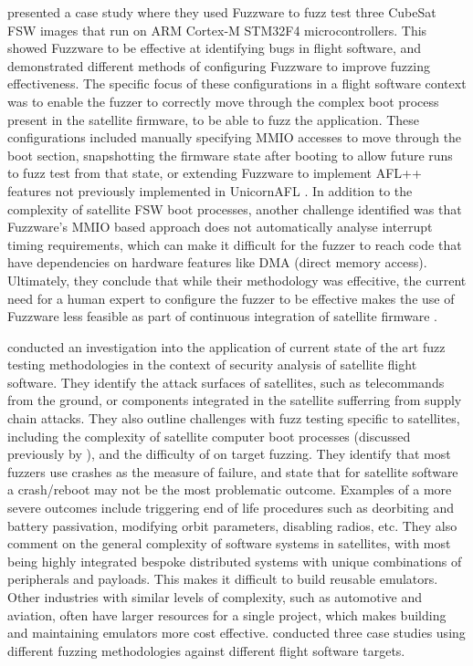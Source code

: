\documentclass[../report.tex]{subfiles}
\begin{document}
\citet{Scharnowski_2023} presented a case study where they used Fuzzware
\citep{Fuzzware_2022} to fuzz test three CubeSat FSW images that run on ARM
Cortex-M STM32F4 microcontrollers. This showed Fuzzware to be effective at
identifying bugs in flight software, and demonstrated different methods of
configuring Fuzzware to improve fuzzing effectiveness. The specific focus of
these configurations in a flight software context was to enable the fuzzer to
correctly move through the complex boot process present in the satellite
firmware, to be able to fuzz the application. These configurations included
manually specifying MMIO accesses to move through the boot section,
snapshotting the firmware state after booting to allow future runs to fuzz test
from that state, or extending Fuzzware to implement AFL++ features not
previously implemented in UnicornAFL \citep{Scharnowski_2023}. In addition to
the complexity of satellite FSW boot processes, another challenge identified
was that Fuzzware's MMIO based approach does not automatically analyse
interrupt timing requirements, which can make it difficult for the fuzzer to
reach code that have dependencies on hardware features like DMA (direct memory
access). Ultimately, they conclude that while their methodology was effecitive,
the current need for a human expert to configure the fuzzer to be effective
makes the use of Fuzzware less feasible as part of continuous integration of
satellite firmware \citep{Scharnowski_2023}.

\citet{Willbold_2024} conducted an investigation into the application of
current state of the art fuzz testing methodologies in the context of security
analysis of satellite flight software. They identify the attack surfaces of
satellites, such as telecommands from the ground, or components integrated in
the satellite sufferring from supply chain attacks. They also outline
challenges with fuzz testing specific to satellites, including the complexity
of satellite computer boot processes (discussed previously by
\citet{Scharnowski_2023}), and the difficulty of on target fuzzing. They
identify that most fuzzers use crashes as the measure of failure, and state
that for satellite software a crash/reboot may not be the most problematic
outcome. Examples of a more severe outcomes include triggering end of life
procedures such as deorbiting and battery passivation, modifying orbit
parameters, disabling radios, etc. They also comment on the general complexity
of software systems in satellites, with most being highly integrated bespoke
distributed systems with unique combinations of peripherals and payloads. This
makes it difficult to build reusable emulators. Other industries with similar
levels of complexity, such as automotive and aviation, often have larger
resources for a single project, which makes building and maintaining emulators
more cost effective. \citet{Willbold_2024} conducted three case studies using
different fuzzing methodologies against different flight software targets.
\end{document}
